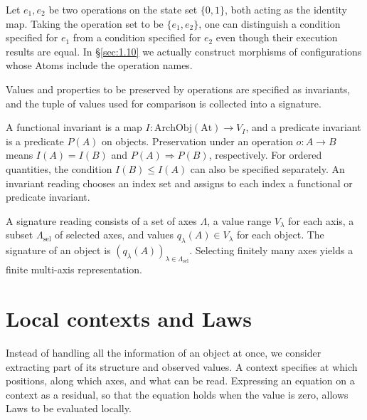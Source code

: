 \begin{example}\label{ex:1.8}

Let $e_1,e_2$ be two operations on the state set $\{0,1\}$, both acting as the
identity map. Taking the operation set to be $\{e_1,e_2\}$, one can distinguish a
condition specified for $e_1$ from a condition specified for $e_2$ even though
their execution results are equal.
In \S\ref{sec:1.10} we actually construct morphisms of configurations whose Atoms
include the operation names.

\end{example}

\begin{definition}\label{def:1.9}

Values and properties to be preserved by operations are specified as invariants,
and the tuple of values used for comparison is collected into a signature.

A functional invariant is a map $I:\mathrm{ArchObj}(\mathrm{At})\to V_I$, and a
predicate invariant is a predicate $P(A)$ on objects.
Preservation under an operation $o:A\to B$ means
$I(A)=I(B)$ and $P(A)\Rightarrow P(B)$, respectively.
For ordered quantities, the condition $I(B)\leq I(A)$ can also be specified
separately. An invariant reading chooses an index set and assigns to each index a
functional or predicate invariant.

A signature reading consists of a set of axes $\Lambda$, a value range
$V_\lambda$ for each axis, a subset $\Lambda_{\mathrm{sel}}$ of selected axes,
and values $q_\lambda(A)\in V_\lambda$ for each object.
The signature of an object is
$(q_\lambda(A))_{\lambda\in\Lambda_{\mathrm{sel}}}$.
Selecting finitely many axes yields a finite multi-axis representation.

\end{definition}

\section{Local contexts and Laws}\label{sec:1.3}

Instead of handling all the information of an object at once, we consider
extracting part of its structure and observed values. A context specifies at
which positions, along which axes, and what can be read. Expressing an equation
on a context as a residual, so that the equation holds when the value is zero, allows Laws to be
evaluated locally.

